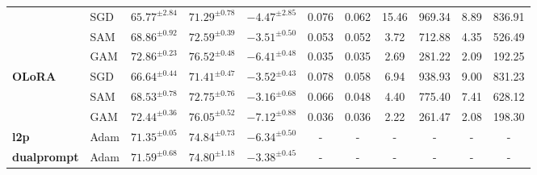 \documentclass[10pt]{article} %
\begin{document}
\begin{table}[htpb]
{\begin{tabular}{l l ccc ccccc c}
& SGD    &$65.77^{\pm 2.84}$ & $71.29^{\pm 0.78}$ & $-4.47^{\pm 2.85}$ & 0.076    & 0.062 & 15.46 & 969.34  & 8.89  & 836.91 \\
& SAM    &$68.86^{\pm 0.92}$ & $72.59^{\pm 0.39}$ & $-3.51^{\pm 0.50}$ & 0.053   & 0.052 & 3.72    & 712.88   & 4.35   & 526.49   \\
\rowcolor{LightPurple} &GAM  &$72.86^{\pm 0.23}$ & $76.52^{\pm 0.48}$ & $-6.41^{\pm 0.48}$ & 0.035   & 0.035 & 2.69    & 281.22   & 2.09   & 192.25   \\
\midrule
\multirow{2}{*}{\textbf{OLoRA}}
& SGD    &$66.64^{\pm 0.44}$ & $71.41^{\pm 0.47}$ & $-3.52^{\pm 0.43}$ & 0.078   & 0.058 & 6.94    & 938.93   & 9.00   & 831.23   \\
& SAM    &$68.53^{\pm 0.78}$ & $72.75^{\pm 0.76}$ & $-3.16^{\pm 0.68}$ & 0.066   & 0.048 & 4.40    & 775.40   & 7.41   & 628.12   \\
\rowcolor{LightPurple} &GAM &$72.44^{\pm 0.36}$ & $76.05^{\pm 0.52}$ & $-7.12^{\pm 0.88}$ & 0.036   & 0.036 & 2.22    & 261.47   & 2.08   & 198.30\\
\midrule
\multirow{1}{*}{\textbf{l2p}}
& Adam   & $71.35^{\pm 0.05}$ & $74.84^{\pm 0.73}$ & $-6.34^{\pm 0.50}$  &-  &- &- &- &- &- \\
\midrule
\multirow{1}{*}{\textbf{dualprompt}}
& Adam   & $71.59^{\pm 0.68}$ & $74.80^{\pm 1.18}$ & $-3.38^{\pm 0.45}$ &-  &- &- &- &- &- \\
\bottomrule
\end{tabular}
}
\end{table}
\end{document}
